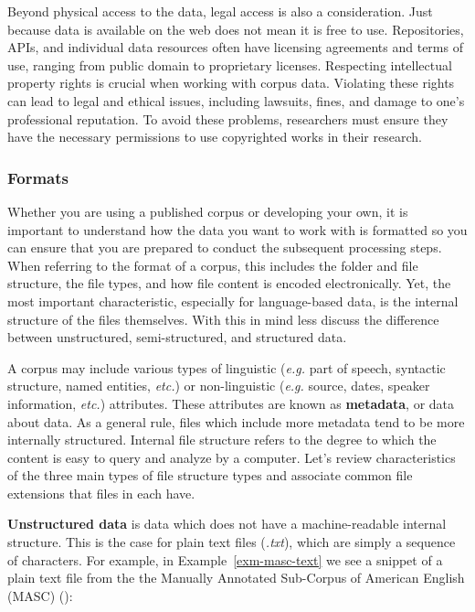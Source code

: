 \documentclass[
  letterpaper,
  DIV=11,
  numbers=noendperiod]{scrreprt}
\theoremstyle{definition}
\theoremstyle{remark}
\begin{document}
Beyond physical access to the data, legal access is also a
consideration. Just because data is available on the web does not mean
it is free to use. Repositories, APIs, and individual data resources
often have licensing agreements and terms of use, ranging from public
domain to proprietary licenses. Respecting intellectual property rights
is crucial when working with corpus data. Violating these rights can
lead to legal and ethical issues, including lawsuits, fines, and damage
to one's professional reputation. To avoid these problems, researchers
must ensure they have the necessary permissions to use copyrighted works
in their research.

\subsubsection{Formats}\label{formats}

Whether you are using a published corpus or developing your own, it is
important to understand how the data you want to work with is formatted
so you can ensure that you are prepared to conduct the subsequent
processing steps. When referring to the format of a corpus, this
includes the folder and file structure, the file types, and how file
content is encoded electronically. Yet, the most important
characteristic, especially for language-based data, is the internal
structure of the files themselves. With this in mind less discuss the
difference between unstructured, semi-structured, and structured data.

A corpus may include various types of linguistic (\emph{e.g.} part of
speech, syntactic structure, named entities, \emph{etc.}) or
non-linguistic (\emph{e.g.} source, dates, speaker information,
\emph{etc.}) attributes. These attributes are known as
\textbf{metadata}, or data about data. As a general rule, files which
include more metadata tend to be more internally structured. Internal
file structure refers to the degree to which the content is easy to
query and analyze by a computer. Let's review characteristics of the
three main types of file structure types and associate common file
extensions that files in each have.

\textbf{Unstructured data} is data which does not have a
machine-readable internal structure. This is the case for plain text
files (\emph{.txt}), which are simply a sequence of characters. For
example, in Example~\ref{exm-masc-text} we see a snippet of a plain text
file from the the Manually Annotated Sub-Corpus of American English
(MASC) ():
\end{document}
